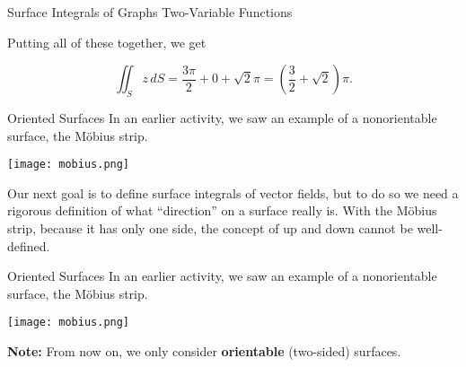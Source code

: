 \documentclass[11pt,english,
handout
]{beamer}
\begin{document}
\begin{frame}[t]{Surface Integrals of Graphs Two-Variable Functions}
\small
\begin{example}

Putting all of these together, we get

\[
\iint_Sz\,dS=\frac{3\pi}{2}+0+\sqrt{2}\pi=\left(\frac{3}{2}+\sqrt{2}\right)\pi.
\]
\end{example}
\end{frame}











\begin{frame}[t]{Oriented Surfaces}
\small
In an earlier activity, we saw an example of a nonorientable surface, the M\"{o}bius strip. 
\vspace{-7mm}
\begin{center}
\texttt{[image: mobius.png]}
\end{center}

Our next goal is to define surface integrals of vector fields, but  to do so we need a rigorous definition of what ``direction'' on a surface really is. With the M\"{o}bius strip, because it has only one side, the concept of up and down cannot be well-defined.
\end{frame}











\begin{frame}[t]{Oriented Surfaces}
\small
In an earlier activity, we saw an example of a nonorientable surface, the M\"{o}bius strip. 
\vspace{-7mm}
\begin{center}
\texttt{[image: mobius.png]}
\end{center}

\textbf{Note:} From now on, we only consider \textbf{orientable} (two-sided) surfaces.
\end{frame}
\end{document}
